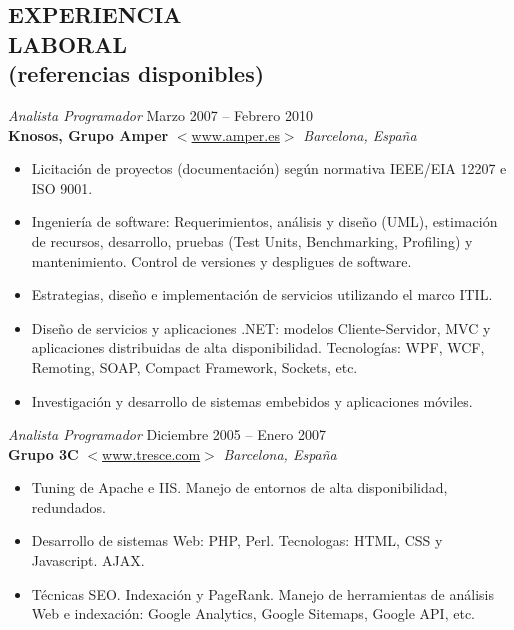 \documentclass[line,margin]{res}
\begin{document}
\begin{resume}
\section{EXPERIENCIA \\LABORAL \\ \footnotesize{(referencias disponibles)}}
                {\sl Analista Programador} \hfill            Marzo 2007 -- Febrero 2010 \\
                \textbf{Knosos, Grupo Amper} 
                $<$\url{www.amper.es}$>$ \hfill \textit{Barcelona, Espa\~{n}a}
                \begin{itemize}  \itemsep 2pt %
                \item Licitaci\'{o}n de proyectos (documentaci\'{o}n) 
                seg\'{u}n normativa IEEE/EIA 12207 e ISO 9001.
                \item Ingenier\'{i}a de software: Requerimientos, an\'{a}lisis y 
                dise\~{n}o (UML), estimaci\'{o}n de recursos, desarrollo, 
                pruebas (Test Units, Benchmarking, Profiling) y mantenimiento. 
                Control de versiones y despligues de software.
                \item Estrategias, dise\~{n}o e implementaci\'{o}n de servicios 
                utilizando el marco ITIL.
                \item Dise\~{n}o de servicios y aplicaciones .NET: modelos 
                Cliente-Servidor, MVC y aplicaciones distribuidas de alta 
                disponibilidad. Tecnolog\'{i}as: WPF, WCF, Remoting, SOAP, 
                Compact Framework, Sockets, etc.
                \item Investigaci\'{o}n y desarrollo de sistemas embebidos y 
                aplicaciones m\'{o}viles.
                \\
                \end{itemize}


                {\sl Analista Programador} \hfill Diciembre 2005 -- Enero 2007 \\
                \textbf{Grupo 3C} 
                $<$\url{www.tresce.com}$>$ \hfill \textit{Barcelona, 
                Espa\~{n}a}
                \begin{itemize}  \itemsep 2pt %
                \item Tuning de Apache e IIS. Manejo de entornos de 
                alta disponibilidad, redundados.
                \item Desarrollo de sistemas Web: PHP, Perl. Tecnologas: HTML, 
                CSS y Javascript. AJAX.
                \item T\'{e}cnicas SEO. Indexaci\'{o}n y PageRank. Manejo de 
                herramientas de an\'{a}lisis Web e indexaci\'{o}n: 
                Google Analytics, Google Sitemaps, Google API, etc.
                \\
                \end{itemize} 


\end{resume}
\end{document}
